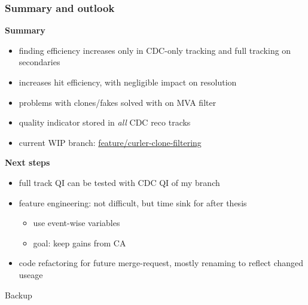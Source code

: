 \documentclass[18pt, aspectratio=169]{beamer}
\begin{document}
\begin{frame}
  \frametitle{Summary and outlook}
  \textbf{Summary}
  \begin{itemize}
  \item finding efficiency increases only in CDC-only tracking and full tracking on secondaries
  \item increases hit efficiency, with negligible impact on resolution
  \item problems with clones/fakes solved with on MVA filter
  \item quality indicator stored in \emph{all} CDC reco tracks
  \item current WIP branch: \href{https://stash.desy.de/projects/B2/repos/software/browse?at=refs\%2Fheads\%2Ffeature\%2Fcurler-clone-filtering}{feature/curler-clone-filtering}
  \end{itemize}
  \textbf{Next steps}
  \begin{itemize}
  \item full track QI can be tested with CDC QI of my branch
  \item feature engineering: not difficult, but time sink for after thesis
    \begin{itemize}
    \item use event-wise variables
    \item goal: keep gains from CA
    \end{itemize}
  \item code refactoring for future merge-request, mostly renaming to reflect changed useage
  \end{itemize}
\end{frame}

\appendix
\backupbegin
\begin{frame}
  \centering \huge
  Backup
\end{frame}
\end{document}
